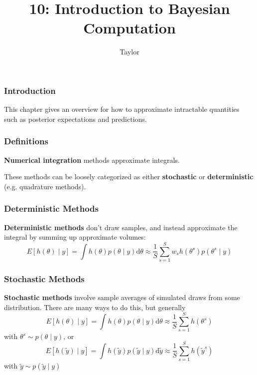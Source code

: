 \documentclass{beamer}
\title["10"]{10: Introduction to Bayesian Computation}
\author{Taylor}
\institute[UVA] 
{
University of Virginia \\
\medskip
\textit{} 
}
\date{}
\begin{document}

\begin{frame}
\titlepage 
\end{frame}

\begin{frame}
\frametitle{Introduction}

This chapter gives an overview for how to approximate intractable quantities such as posterior expectations and predictions. 

\end{frame}

\begin{frame}
\frametitle{Definitions}

{\bf Numerical integration} methods approximate integrals. 
\newline

These methods can be loosely categorized as either {\bf stochastic} or {\bf deterministic} (e.g. quadrature methods).


\end{frame}




\begin{frame}
\frametitle{Deterministic Methods}

{\bf Deterministic methods} don't draw samples, and instead approximate the integral by summing up approximate volumes:
\[
E[h(\theta) \mid y] = \int h(\theta) p(\theta \mid y) \text{d}\theta \approx \frac{1}{S} \sum_{s=1}^S w_s h(\theta^s)p(\theta^s \mid y)
\]

\end{frame}

\begin{frame}
\frametitle{Stochastic Methods}

{\bf Stochastic methods} involve sample averages of simulated draws from some distribution. There are many ways to do this, but generally
\[
E[h(\theta) \mid y] = \int h(\theta) p(\theta \mid y) \text{d}\theta \approx \frac{1}{S} \sum_{s=1}^S h(\theta^s)
\]
with $\theta^s \sim p(\theta \mid y)$, or
\[
E[h(\tilde{y}) \mid y] = \int h(\tilde{y}) p(\tilde{y} \mid y) \text{d} \tilde{y} \approx \frac{1}{S} \sum_{s=1}^S h(\tilde{y}^s)
\]
with $\tilde{y} \sim p(\tilde{y} \mid y)$

\end{frame}
\end{document}
